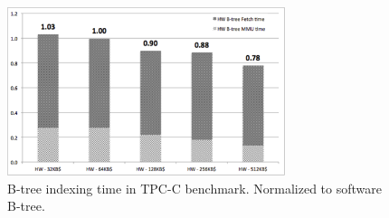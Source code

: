 \begin{figure}[h]
  \centering
  \includegraphics[width=3.2in]{figures/bt_index_time.pdf}
  \caption{B-tree indexing time in TPC-C benchmark. Normalized to software B-tree.}
  \label{fig:bt_index_time}
\end{figure}
